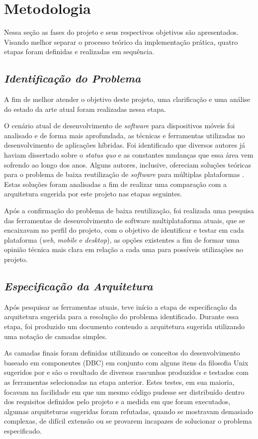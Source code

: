 \section{\esp Metodologia}
Nessa seção as fases do projeto e seus respectivos objetivos são apresentados. Visando melhor separar o processo teórico da implementação prática, quatro etapas foram definidas e realizadas em sequência.

\subsection{{\it Identificação do Problema}}
A fim de melhor atender o objetivo deste projeto, uma clarificação e uma análise do estado da arte atual foram realizadas nessa etapa.

O cenário atual de desenvolvimento de \textit{software} para dispositivos móveis foi analisado e de forma mais aprofundada, as técnicas e ferramentas utilizadas no desenvolvimento de aplicações híbridas. Foi identificado que diversos autores já haviam dissertado sobre o \textit{status quo} e as constantes mudanças que essa área vem sofrendo ao longo dos anos. Alguns autores, inclusive, ofereciam soluções teóricas para o problema de baixa reutilização de \textit{software} para múltiplas plataformas \cite{Diwakar2012,ionicFIT}. Estas soluções foram analisadas a fim de realizar uma comparação com a arquitetura sugerida por este projeto nas etapas seguintes.

Após a confirmação do problema de baixa reutilização, foi realizada uma pesquisa das ferramentas de desenvolvimento de software multiplataforma atuais, que se encaixavam no perfil do projeto, com o objetivo de identificar e testar em cada plataforma (\textit{web}, \textit{mobile} e \textit{desktop}), as opções existentes a fim de formar uma opinião técnica mais clara em relação a cada uma para possíveis utilizações no projeto.

\subsection{{\it Especificação da Arquitetura}}

Após pesquisar as ferramentas atuais, teve início a etapa de especificação da arquitetura sugerida para a resolução do problema identificado. Durante essa etapa, foi produzido um documento contendo a arquitetura sugerida utilizando uma notação de camadas simples.

As camadas finais foram definidas utilizando os conceitos do desenvolvimento baseado em componentes (DBC) em conjunto com alguns itens da filosofia Unix sugeridos por \cite{unixPhilosophy} e são o resultado de diversos rascunhos produzidos e testados com as ferramentas selecionadas na etapa anterior. Estes testes, em sua maioria, focavam na facilidade em que um mesmo código pudesse ser distribuído dentro dos requisitos definidos pelo projeto e a medida em que foram executados, algumas arquiteturas sugeridas foram refutadas, quando se mostravam demasiado complexas, de difícil extensão ou se provarem incapazes de solucionar o problema especificado. 

